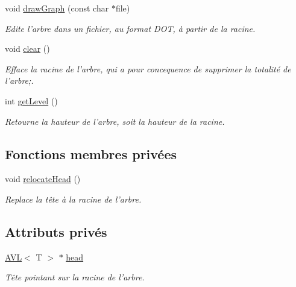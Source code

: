 \begin{DoxyCompactItemize}
void \hyperlink{class_tree_a_v_l_a78c64a9f7c30be138d812569ce6bae3a}{draw\+Graph} (const char $\ast$file)
\begin{DoxyCompactList}\small\item\em Edite l'arbre dans un fichier, au format D\+O\+T, à partir de la racine. \end{DoxyCompactList}\item 
void \hyperlink{class_tree_a_v_l_a0fe5b522c1b6e620e3a6092c3a96b76c}{clear} ()
\begin{DoxyCompactList}\small\item\em Efface la racine de l'arbre, qui a pour concequence de supprimer la totalité de l'arbre;. \end{DoxyCompactList}\item 
int \hyperlink{class_tree_a_v_l_a92bb11a553775814dfee115f2aa5e16d}{get\+Level} ()
\begin{DoxyCompactList}\small\item\em Retourne la hauteur de l'arbre, soit la hauteur de la racine. \end{DoxyCompactList}\end{DoxyCompactItemize}
\subsection*{Fonctions membres privées}
\begin{DoxyCompactItemize}
\item 
void \hyperlink{class_tree_a_v_l_af511d72bca244f41fc2bc86ad4348d3f}{relocate\+Head} ()
\begin{DoxyCompactList}\small\item\em Replace la tête à la racine de l'arbre. \end{DoxyCompactList}\end{DoxyCompactItemize}
\subsection*{Attributs privés}
\begin{DoxyCompactItemize}
\item 
\hyperlink{class_a_v_l}{A\+V\+L}$<$ T $>$ $\ast$ \hyperlink{class_tree_a_v_l_a7d77c489adc9149acc336c101086ca24}{head}
\begin{DoxyCompactList}\small\item\em Tête pointant sur la racine de l'arbre. \end{DoxyCompactList}\end{DoxyCompactItemize}


